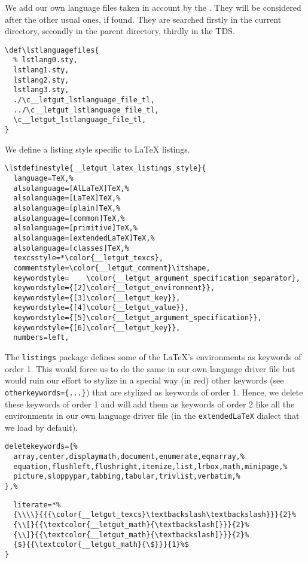 \documentclass{letgut}
\begin{document}
We add our own language files taken in account by the . They
will be considered after the other usual ones, if found. They are searched firstly
in the current directory, secondly in the parent directory, thirdly in the TDS.

\begin{lstlisting}
\def\lstlanguagefiles{
  % lstlang0.sty,
  lstlang1.sty,
  lstlang2.sty,
  lstlang3.sty,
  ./\c__letgut_lstlanguage_file_tl,
  ../\c__letgut_lstlanguage_file_tl,
  \c__letgut_lstlanguage_file_tl,
}
\end{lstlisting}

We define a listing style specific to \LaTeX{} listings.

\begin{lstlisting}
\lstdefinestyle{__letgut_latex_listings_style}{
  language=TeX,%
  alsolanguage=[AlLaTeX]TeX,%
  alsolanguage=[LaTeX]TeX,%
  alsolanguage=[plain]TeX,%
  alsolanguage=[common]TeX,%
  alsolanguage=[primitive]TeX,%
  alsolanguage=[extendedLaTeX]TeX,%
  alsolanguage=[classes]TeX,%
  texcsstyle=*\color{__letgut_texcs},
  commentstyle=\color{__letgut_comment}\itshape,
  keywordstyle=    \color{__letgut_argument_specification_separator},
  keywordstyle={[2]\color{__letgut_environment}},
  keywordstyle={[3]\color{__letgut_key}},
  keywordstyle={[4]\color{__letgut_value}},
  keywordstyle={[5]\color{__letgut_argument_specification}},
  keywordstyle={[6]\color{__letgut_key}},
  numbers=left,
\end{lstlisting}

The \lstinline+listings+ package defines some of the LaTeX's environments as keywords of
order 1. This would force us to do the same in our own language driver file but
would ruin our effort to stylize in a special way (in red) other keywords (see
\lstinline+otherkeywords={...}+) that are stylized as keywords of order 1. Hence, we
delete these keywords of order 1 and will add them as keywords of order 2 like
all the environments in our own language driver file (in the \lstinline+extendedLaTeX+ dialect
that we load by default).

\begin{lstlisting}
deletekeywords={%
  array,center,displaymath,document,enumerate,eqnarray,%
  equation,flushleft,flushright,itemize,list,lrbox,math,minipage,%
  picture,sloppypar,tabbing,tabular,trivlist,verbatim,%
},%
\end{lstlisting}

\begin{lstlisting}
  literate=*%
  {\\\\}{{{\color{__letgut_texcs}\textbackslash\textbackslash}}}{2}%
  {\\[}{{\textcolor{__letgut_math}{\textbackslash[}}}{2}%
  {\\]}{{\textcolor{__letgut_math}{\textbackslash]}}}{2}%
  {$}{{\textcolor{__letgut_math}{\$}}}{1}%$
}
\end{lstlisting}
\end{document}
